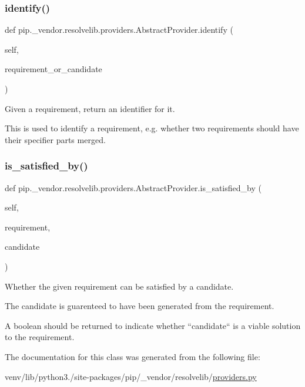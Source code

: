 \subsubsection{\texorpdfstring{identify()}{identify()}}
{\footnotesize\ttfamily def pip.\+\_\+vendor.\+resolvelib.\+providers.\+Abstract\+Provider.\+identify (\begin{DoxyParamCaption}\item[{}]{self,  }\item[{}]{requirement\+\_\+or\+\_\+candidate }\end{DoxyParamCaption})}

\begin{DoxyVerb}Given a requirement, return an identifier for it.

This is used to identify a requirement, e.g. whether two requirements
should have their specifier parts merged.
\end{DoxyVerb}
 \mbox{\label{classpip_1_1__vendor_1_1resolvelib_1_1providers_1_1AbstractProvider_aaf6d9dda33c45438d6dcd50cf7aabf97}} 
\subsubsection{\texorpdfstring{is\+\_\+satisfied\+\_\+by()}{is\_satisfied\_by()}}
{\footnotesize\ttfamily def pip.\+\_\+vendor.\+resolvelib.\+providers.\+Abstract\+Provider.\+is\+\_\+satisfied\+\_\+by (\begin{DoxyParamCaption}\item[{}]{self,  }\item[{}]{requirement,  }\item[{}]{candidate }\end{DoxyParamCaption})}

\begin{DoxyVerb}Whether the given requirement can be satisfied by a candidate.

The candidate is guarenteed to have been generated from the
requirement.

A boolean should be returned to indicate whether ``candidate`` is a
viable solution to the requirement.
\end{DoxyVerb}
 

The documentation for this class was generated from the following file\+:\begin{DoxyCompactItemize}
\item 
venv/lib/python3./site-\/packages/pip/\+\_\+vendor/resolvelib/\hyperlink{providers_8py}{providers.\+py}\end{DoxyCompactItemize}
